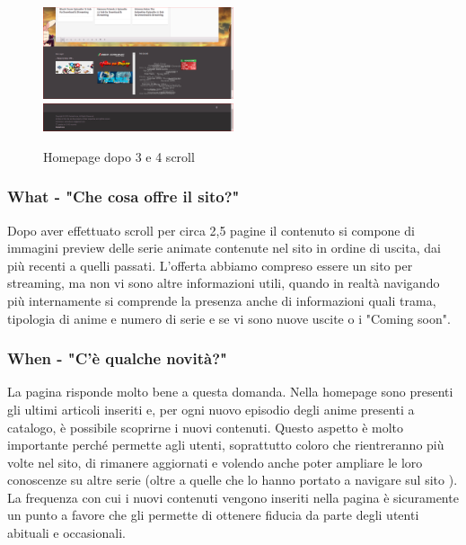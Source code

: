 \begin{figure}[H]
	\includegraphics[width=0.5\textwidth]{img/homepage04.png}
	\includegraphics[width=0.5\textwidth]{img/homepage05.png}
	\caption{Homepage dopo 3 e 4 scroll} 
	\label{img3} 
\end{figure}

\subsubsection{What - "Che cosa offre il sito?"} \label{HWhat}
Dopo aver effettuato scroll per circa 2,5 pagine il contenuto si compone di immagini preview delle serie animate contenute nel sito in ordine di uscita, dai più recenti a quelli passati. L'offerta abbiamo compreso essere un sito per streaming, ma non vi sono altre informazioni utili, quando in realtà navigando più internamente si comprende la presenza anche di informazioni quali trama, tipologia di anime e numero di serie e se vi sono nuove uscite o i "Coming soon".

\subsubsection{When - "C'è qualche novità?"} \label{HWhen}
La pagina risponde molto bene a questa domanda. Nella homepage sono presenti gli ultimi articoli inseriti e, per ogni nuovo episodio degli anime presenti a catalogo, è possibile scoprirne i nuovi contenuti.
Questo aspetto è molto importante perché permette agli utenti, soprattutto coloro che rientreranno più volte nel sito, di rimanere aggiornati e volendo anche poter ampliare le loro conoscenze su altre serie (oltre a quelle che lo hanno portato a navigare sul sito \nomeSito). La frequenza con cui i nuovi contenuti vengono inseriti nella pagina è sicuramente un punto a favore che gli permette di ottenere fiducia da parte degli utenti abituali e occasionali.

